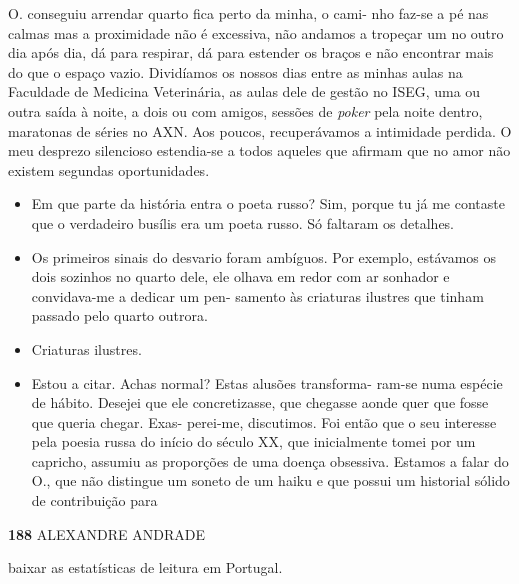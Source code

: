 O. conseguiu arrendar quarto fica perto da minha, o cami- nho faz-se a
pé nas calmas mas a proximidade não é excessiva, não andamos a tropeçar
um no outro dia após dia, dá para respirar, dá para estender os braços e
não encontrar mais do que o espaço vazio. Dividíamos os nossos dias
entre as minhas aulas na Faculdade de Medicina Veterinária, as aulas
dele de gestão no ISEG, uma ou outra saída à noite, a dois ou com
amigos, sessões de \emph{poker }pela noite dentro, maratonas de séries
no AXN. Aos poucos, recuperávamos a intimidade perdida. O meu desprezo
silencioso estendia-se a todos aqueles que afirmam que no amor não
existem segundas oportunidades.

\begin{itemize}
\tightlist
\item
  Em que parte da história entra o poeta russo? Sim, porque tu já me
  contaste que o verdadeiro busílis era um poeta russo. Só faltaram os
  detalhes.
\item
  Os primeiros sinais do desvario foram ambíguos. Por exemplo, estávamos
  os dois sozinhos no quarto dele, ele olhava em redor com ar sonhador e
  convidava-me a dedicar um pen- samento às criaturas ilustres que
  tinham passado pelo quarto outrora.
\item
  Criaturas ilustres.
\item
  Estou a citar. Achas normal? Estas alusões transforma- ram-se numa
  espécie de hábito. Desejei que ele concretizasse, que chegasse aonde
  quer que fosse que queria chegar. Exas- perei-me, discutimos. Foi
  então que o seu interesse pela poesia russa do início do século XX,
  que inicialmente tomei por um capricho, assumiu as proporções de uma
  doença obsessiva. Estamos a falar do O., que não distingue um soneto
  de um haiku e que possui um historial sólido de contribuição para
\end{itemize}

\textbf{188 }ALEXANDRE ANDRADE

baixar as estatísticas de leitura em Portugal.

